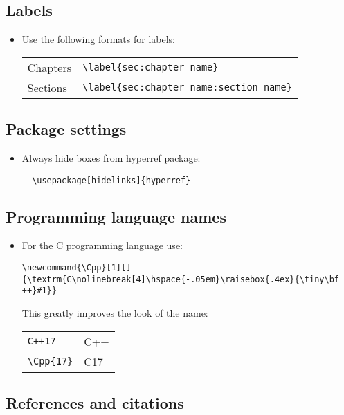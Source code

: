 \documentclass[10pt, letter]{article}
\newcommand{\Cpp}[1][]{\textrm{C\nolinebreak[4]\hspace{-.05em}\raisebox{.4ex}{\tiny\bf
      ++}#1}}
\begin{document}
\subsection{Labels}
\label{sec:labels}
\begin{itemize}
\item Use the following formats for labels:
  \begin{center}
    \begin{tabular}{ll}
      Chapters & \verb|\label{sec:chapter_name}| \\
      Sections & \verb|\label{sec:chapter_name:section_name}|
    \end{tabular}
  \end{center}
\end{itemize}

\subsection{Package settings}
\begin{itemize}
\item Always hide boxes from hyperref package:
\begin{lstlisting}
  \usepackage[hidelinks]{hyperref}
\end{lstlisting}
\end{itemize}

\subsection{Programming language names}
\begin{itemize}
\item For the \Cpp{} programming language use:
\begin{lstlisting}
\newcommand{\Cpp}[1][]{\textrm{C\nolinebreak[4]\hspace{-.05em}\raisebox{.4ex}{\tiny\bf ++}#1}}
\end{lstlisting}
  This greatly improves the look of the name:
      \begin{center}
    \begin{tabular}[h!]{ll} 
      \verb|C++17| & C++ \\
      \verb|\Cpp{17}| & \Cpp{17}
    \end{tabular}
  \end{center}
\end{itemize}

\subsection{References and citations}
\end{document}
